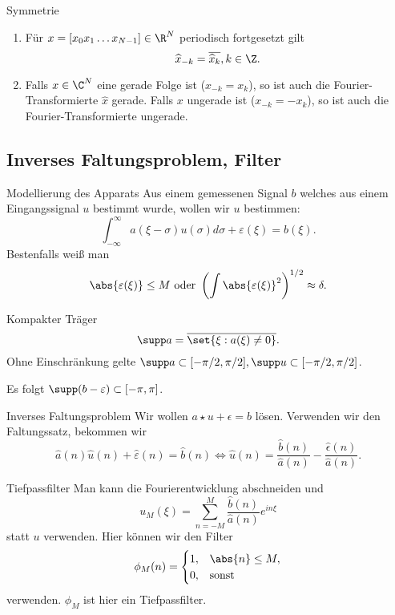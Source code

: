 \begin{karte}{Symmetrie}
    \begin{enumerate}
        \item Für \(x=[x_0 x_1 \ldots x_{N-1}] \in \R^N\) periodisch fortgesetzt gilt 
        \[ \widehat{x}_{-k} = \overline{\widehat{x}_k}, k \in \Z. \]
        \item Falls \(x\in \C^N\) eine gerade Folge ist (\(x_{-k} = x_k\)), so ist auch 
        die Fourier-Transformierte \(\widehat{x}\) gerade. Falls \(x\) ungerade ist (\(x_{-k} = -x_k\)), 
        so ist auch die Fourier-Transformierte ungerade.
    \end{enumerate}
\end{karte}

\subsection{Inverses Faltungsproblem, Filter}

\begin{karte}{Modellierung des Apparats}
    Aus einem gemessenen Signal \(b\) welches aus einem Eingangssignal \(u\)
    bestimmt wurde, wollen wir \(u\) bestimmen: 
    \[ \int_{-\infty}^\infty a(\xi-\sigma) u(\sigma) d\sigma + \varepsilon(\xi) = b(\xi). \]
    Bestenfalls weiß man 
    \[ \abs{\varepsilon(\xi)} \leq M \text{ oder } \left( \int \abs{\varepsilon(\xi)}^2 \right)^{1/2} \approx \delta. \]
\end{karte}

\begin{karte}{Kompakter Träger}
    \[ \supp a = \overline{\set{ \xi: a(\xi) \neq 0 }}. \]
    Ohne Einschränkung gelte \( \supp a \subset [-\pi/2,\pi/2], \supp u \subset [-\pi/2,\pi/2] \).

    Es folgt \( \supp(b-\varepsilon) \subset [-\pi, \pi] \).
\end{karte}

\begin{karte}{Inverses Faltungsproblem}
    Wir wollen \( a\star u + \epsilon = b \) lösen. 
    Verwenden wir den Faltungssatz, bekommen wir 
    \[ \widehat{a}(n) \widehat{u}(n) + \widehat{\varepsilon}(n) = \widehat{b}(n) 
    \Leftrightarrow \widehat{u}(n) = \frac{\widehat{b}(n)}{\widehat{a}(n)} - \frac{\widehat{\epsilon}(n)}{\widehat{a}(n)}. \]
\end{karte}

\begin{karte}{Tiefpassfilter}
    Man kann die Fourierentwicklung abschneiden und 
    \[ u_M(\xi) = \sum_{n=-M}^M \frac{\widehat{b}(n)}{\widehat{a}(n)} e^{in\xi} \] 
    statt \(u\) verwenden. Hier können wir den Filter 
    \[ \phi_M(n) = \begin{cases}
        1, & \abs{n} \leq M, \\ 
        0, & \text{sonst}
    \end{cases} \]
    verwenden. \(\phi_M\) ist hier ein Tiefpassfilter. 
\end{karte}

